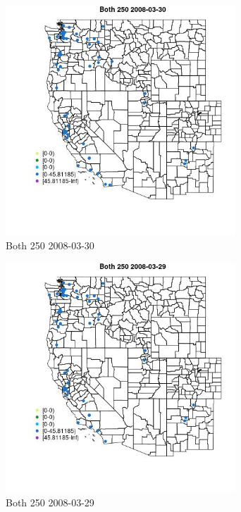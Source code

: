 \begin{figure} 
\centering  
\includegraphics[width=0.77\textwidth]{Code_Outputs/Report_ML_input_PM25_Step4_part_e_de_duplicated_aves_MapObsBoth_2502008-03-30.jpg} 
\caption{\label{fig:Report_ML_input_PM25_Step4_part_e_de_duplicated_avesMapObsBoth_2502008-03-30}Both 250 2008-03-30} 
\end{figure} 
 

\begin{figure} 
\centering  
\includegraphics[width=0.77\textwidth]{Code_Outputs/Report_ML_input_PM25_Step4_part_e_de_duplicated_aves_MapObsBoth_2502008-03-29.jpg} 
\caption{\label{fig:Report_ML_input_PM25_Step4_part_e_de_duplicated_avesMapObsBoth_2502008-03-29}Both 250 2008-03-29} 
\end{figure} 
 

